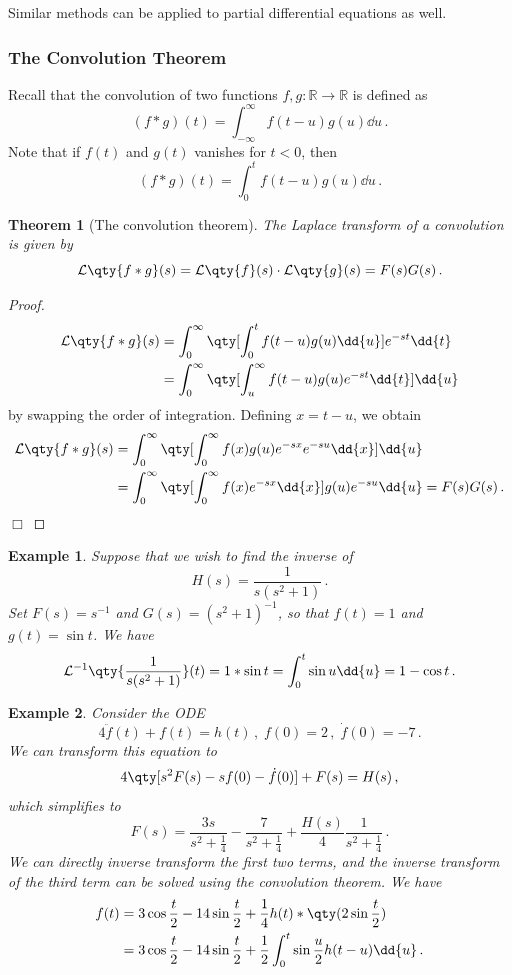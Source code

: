 \documentclass{article}
\theoremstyle{plain}\theoremheaderfont{\normalfont\itshape}\theorembodyfont{\rmfamily}\theoremseparator{.}\newtheorem*{rem}{Remark}\newtheorem*{ex}{Example}\newtheorem*{proof}{Proof}\newtheorem*{altp}{Alternative proof}
\theoremstyle{plain}\theoremheaderfont{\normalfont\bfseries}\theorembodyfont{\rmfamily}\theoremseparator{.}\newtheorem{thm}{Theorem}[section]\newtheorem{lem}[thm]{Lemma}\newtheorem{prop}[thm]{Proposition}\newtheorem*{cor}{Corollary}\newtheorem{defn}[thm]{Definition}\newtheorem{clm}[thm]{Claim}\newtheorem{clminproof}{Claim}
\theoremstyle{break}\theoremheaderfont{\normalfont\itshape}\theorembodyfont{\rmfamily}\theoremseparator{.\medskip}\newtheorem*{proofskip}{Proof}\newtheorem*{exs}{Examples}\newtheorem*{rems}{Remarks}
\theoremstyle{break}\theoremheaderfont{\normalfont\bfseries}\theorembodyfont{\rmfamily}\theoremseparator{.\medskip}\newtheorem{lemskip}[thm]{Lemma}\newtheorem{defnskip}[thm]{Definition}\newtheorem{propskip}[thm]{Proposition}\newtheorem{thmskip}[thm]{Theorem}
\numberwithin{equation}{section}
\newcommand{\qed}{\hfill\ensuremath{\Box}}
\newcommand{\lt}[1]{\mathcal{L}\qty{ #1 }}
\begin{document}
	Similar methods can be applied to partial differential equations as well.

	\subsubsection{The Convolution Theorem}
	Recall that the convolution of two functions \(f,g:\mathbb{R}\to\mathbb{R}\) is defined as
	\[(f*g)(t)=\int_{-\infty}^{\infty}f(t-u)g(u)\dd{u}\,.\]
	Note that if \(f(t)\) and \(g(t)\) vanishes for \(t<0\), then
	\[(f*g)(t)=\int_{0}^{t}f(t-u)g(u)\dd{u}\,.\]
	\begin{thm}[The convolution theorem]
		The Laplace transform of a convolution is given by
		\[\lt{f*g}(s)=\lt{f}(s)\cdot\lt{g}(s)=F(s)G(s)\,.\]
	\end{thm}
	\begin{proof}
		\begin{align*}
			\lt{f*g}(s)&=\int_{0}^{\infty}\qty[\int_{0}^{t}f(t-u)g(u)\dd{u}]e^{-st}\dd{t}\\
			&=\int_{0}^{\infty}\qty[\int_{u}^{\infty}f(t-u)g(u)e^{-st}\dd{t}]\dd{u}
		\end{align*}
		by swapping the order of integration. Defining \(x=t-u\), we obtain
		\begin{align*}
			\lt{f*g}(s)&=\int_{0}^{\infty}\qty[\int_{0}^{\infty}f(x)g(u)e^{-sx}e^{-su}\dd{x}]\dd{u}\\
			&=\int_{0}^{\infty}\qty[\int_{0}^{\infty}f(x)e^{-sx}\dd{x}]g(u)e^{-su}\dd{u}=F(s)G(s)\,.
		\end{align*}\qed
	\end{proof}
	\begin{ex}
		Suppose that we wish to find the inverse of
		\[H(s)=\frac{1}{s(s^2+1)}\,.\]
		Set \(F(s)=s^{-1}\) and \(G(s)=(s^2+1)^{-1}\), so that \(f(t)=1\) and \(g(t)=\sin t\). We have
		\[\mathcal{L}^{-1}\qty{\frac{1}{s(s^2+1)}}(t)=1*\sin t=\int_{0}^{t}\sin u\dd{u}=1-\cos t\,.\]
	\end{ex}
	\begin{ex}
		Consider the ODE
		\[4\ddot{f}(t)+f(t)=h(t)\,,\;f(0)=2\,,\;\dot{f}(0)=-7\,.\]
		We can transform this equation to
		\[4\qty[s^2F(s)-sf(0)-\dot{f}(0)]+F(s)=H(s)\,,\]
		which simplifies to
		\[F(s)=\frac{3s}{s^2+\frac{1}{4}}-\frac{7}{s^2+\frac{1}{4}}+\frac{H(s)}{4}\frac{1}{s^2+\frac{1}{4}}\,.\]
		We can directly inverse transform the first two terms, and the inverse transform of the third term can be solved using the convolution theorem. We have
		\begin{align*}
			f(t)&=3\cos\frac{t}{2}-14\sin\frac{t}{2}+\frac{1}{4}h(t)*\qty(2\sin\frac{t}{2})\\
			&=3\cos\frac{t}{2}-14\sin\frac{t}{2}+\frac{1}{2}\int_{0}^{t}\sin\frac{u}{2}h(t-u)\dd{u}\,.
		\end{align*}
	\end{ex}
	
\end{document}
